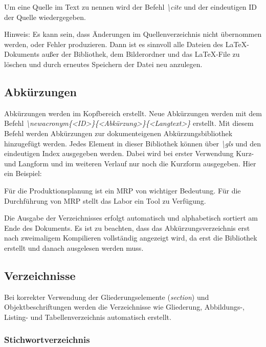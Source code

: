 		Um eine Quelle im Text zu nennen wird der Befehl \textit{\textbackslash cite} und der eindeutigen ID der Quelle wiedergegeben. \cite{Herrmann.2009}

		Hinweis: Es kann sein, dass Änderungen im Quellenverzeichnis nicht übernommen werden, oder Fehler produzieren. Dann ist es sinnvoll alle Dateien des \LaTeX-Dokuments außer der Bibliothek, dem Bilderordner und das \LaTeX-File zu löschen und durch erneutes Speichern der Datei neu anzulegen.

		\subsection{Abkürzungen}
		\label{ch:abkuerzung}
		Abkürzungen werden im  Kopfbereich erstellt. Neue Abkürzungen werden mit dem Befehl
		\textit{\textbackslash newacronym\{\textless ID\textgreater\}\{\textless Abkürzung\textgreater\}\{\textless Langtext\textgreater\}} erstellt. Mit diesem Befehl werden Abkürzungen zur dokumenteigenen Abkürzungsbibliothek hinzugefügt werden. Jedes Element in dieser Bibliothek können über \textit{\textbackslash gls} und den eindeutigen Index ausgegeben werden. Dabei wird bei erster Verwendung Kurz- und Langform und im weiteren Verlauf nur noch die Kurzform ausgegeben. Hier ein Beispiel:

		Für die Produktionsplanung ist ein \gls{MRP} von wichtiger Bedeutung. Für die Durchführung von \gls{MRP} stellt das Labor ein Tool zu Verfügung.

		Die Ausgabe der Verzeichnisses erfolgt automatisch und alphabetisch sortiert am Ende des Dokuments. Es ist zu beachten, dass das Abkürzungsverzeichnis erst nach zweimaligem Kompilieren vollständig angezeigt wird, da erst die Bibliothek erstellt und danach ausgelesen werden muss.

		\subsection{Verzeichnisse}
		\label{ch:verzeichnisse}
		Bei korrekter Verwendung der Gliederungselemente (\textit{section}) und Objektbeschriftungen werden die Verzeichnisse wie Gliederung, Abbildungs-, Listing- und Tabellenverzeichnis automatisch erstellt.

        \subsubsection{Stichwortverzeichnis}

